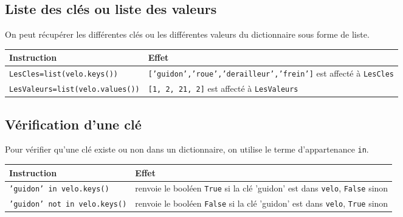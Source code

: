 \subsection*{Liste des clés ou liste des valeurs}
On peut récupérer les différentes clés ou les différentes valeurs du dictionnaire sous forme de liste.

\begin{center}
\begin{tabular}{|l|p{10cm}|}\hline Instruction & Effet \\
\hline
\texttt {LesCles=list(velo.keys())} & \texttt{['guidon','roue','derailleur','frein']} est affecté à \texttt{LesCles}\\
\hline
\texttt {LesValeurs=list(velo.values())} & \texttt{[1, 2, 21, 2]} est affecté à \texttt{LesValeurs}\\
\hline
\end{tabular}
\end{center}


\subsection*{Vérification d'une clé}
Pour vérifier qu'une clé existe ou non dans un dictionnaire, on utilise le terme d'appartenance \texttt{in}.

\begin{center}
\begin{tabular}{|l|p{11cm}|}\hline Instruction & Effet \\
\hline
\texttt{'guidon' in velo.keys()} & renvoie le booléen \texttt{True} si la clé 'guidon' est dans \texttt{velo}, \texttt{False} sinon\\
\hline
\texttt{'guidon' not in velo.keys()} & renvoie le booléen \texttt{False} si la clé 'guidon' est dans \texttt{velo}, \texttt{True} sinon\\
\hline
\end{tabular}
\end{center}

